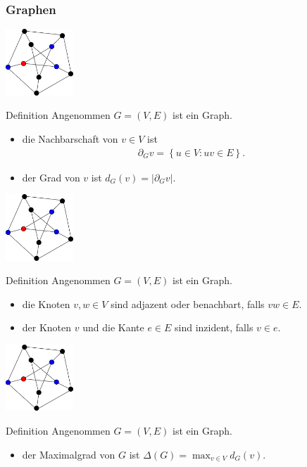 \documentclass[aspectratio=1610, 11pt]{beamer}
\newcommand\cbc[1]{\left\{{#1}\right\}}
\newcommand{\mytitle}{Graphen}
\begin{document}
\begin{frame}\frametitle{\mytitle}
	\begin{overprint}
	\hfill\includegraphics[height=25mm]{images/petersen4.pdf}
	\begin{block}{Definition}
		Angenommen $G=(V,E)$ ist ein Graph. 
		\begin{itemize}
			\item die \alert{Nachbarschaft} von $v\in V$ ist
				\begin{align*}
					\partial_Gv=\cbc{u\in V:uv\in E}.
				\end{align*}
			\item der \alert{Grad} von $v$ ist $d_G(v)=|\partial_Gv|$.
		\end{itemize}
	\end{block}
	\hfill\includegraphics[height=25mm]{images/petersen4.pdf}
	\begin{block}{Definition}
		Angenommen $G=(V,E)$ ist ein Graph. 
		\begin{itemize}
			\item die Knoten $v,w\in V$ sind \alert{adjazent} oder \alert{benachbart}, falls $vw\in E$.
			\item der Knoten $v$ und die Kante $e\in E$ sind \alert{inzident}, falls $v\in e$.
		\end{itemize}
	\end{block}
	\hfill\includegraphics[height=25mm]{images/petersen4.pdf}
	\begin{block}{Definition}
		Angenommen $G=(V,E)$ ist ein Graph. 
		\begin{itemize}
			\item der \alert{Maximalgrad} von $G$ ist $\Delta(G)=\max_{v\in V}d_G(v).$

\end{itemize}
\end{block}
\end{overprint}
\end{frame}
\end{document}
